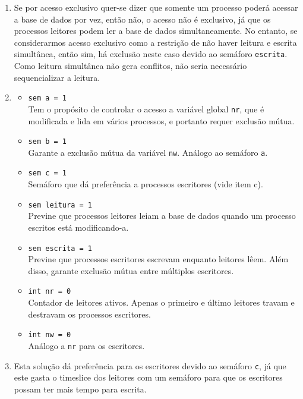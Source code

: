 \documentclass{amsart}
\theoremstyle{plain}
\numberwithin{equation}{section}
\newcommand{\code}[1]{\lstinline[mathescape=true]{#1}}
\begin{document}
\begin{enumerate}[label=(\alph*)]
  \item Se por acesso exclusivo quer-se dizer que somente um processo poderá acessar a base de
    dados por vez, então não, o acesso não é exclusivo, já que os processos leitores podem ler a
    base de dados simultaneamente. No entanto, se considerarmos acesso exclusivo como a restrição
    de não haver leitura e escrita simultânea, então sim, há exclusão neste caso devido ao semáforo
    \code{escrita}. Como leitura simultânea não gera conflitos, não seria necessário
    sequencializar a leitura.
  \item \begin{itemize}
      \item \code{sem a = 1}\\
        Tem o propósito de controlar o acesso a variável global \code{nr}, que é modificada e lida
        em vários processos, e portanto requer exclusão mútua.
      \item \code{sem b = 1}\\
        Garante a exclusão mútua da variável \code{nw}. Análogo ao semáforo \code{a}.
      \item \code{sem c = 1}\\
        Semáforo que dá preferência a processos escritores (vide item c).
      \item \code{sem leitura = 1}\\
        Previne que processos leitores leiam a base de dados quando um processo escritos está
        modificando-a.
      \item \code{sem escrita = 1}\\
        Previne que processos escritores escrevam enquanto leitores lêem. Além disso, garante
        exclusão mútua entre múltiplos escritores.
      \item \code{int nr = 0}\\
        Contador de leitores ativos. Apenas o primeiro e último leitores travam e destravam os
        processos escritores.
      \item \code{int nw = 0}\\
        Análogo a \code{nr} para os escritores.
    \end{itemize}
  \item Esta solução dá preferência para os escritores devido ao semáforo \code{c}, já que este
    gasta o timeslice dos leitores com um semáforo para que os escritores possam ter mais tempo
    para escrita.
\end{enumerate}
\end{document}
